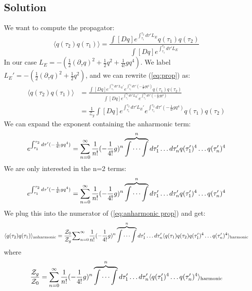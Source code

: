 \documentclass{article}
\begin{document}
\subsection*{Solution}
We want to compute the propagator:\\
\begin{equation} \label{eq:prop}
    \langle q(\tau_2)q(\tau_1)\rangle=\frac{\int [Dq]e^{\int_{\tau_1}^{\tau_2}d\tau'L_E}q(\tau_1)q(\tau_2)}{\int [Dq]e^{\int_{\tau_1}^{\tau_2}d\tau'L_E}}
\end{equation}
In our case $L_E=-(\frac{1}{2}(\partial_\tau q)^2+\frac{1}{2}q^2+\frac{1}{4!}gq^4)$. We label $L_E'=-(\frac{1}{2}(\partial_\tau q)^2+\frac{1}{2}q^2)$, and we can rewrite (\ref{eq:prop}) as:
\begin{equation} 
\begin{split}
    \langle q(\tau_2)q(\tau_1)\rangle & 
    =\frac{\int [Dq]e^{\int_{\tau_1}^{\tau_2}d\tau'L_E'}e^{\int_{\tau_1}^{\tau_2}d\tau' (-\frac{1}{4!}gq^4)}q(\tau_1)q(\tau_2)}{\int [Dq]e^{\int_{\tau_1}^{\tau_2}d\tau'L_E'}e^{\int_{\tau_1}^{\tau_2}d\tau' (-\frac{1}{4!}gq^4)}}\\
    &=\frac{1}{\mathcal{Z}_g}\int [Dq]e^{\int_{\tau_1}^{\tau_2}d\tau'L_E'}e^{\int_{\tau_1}^{\tau_2}d\tau' (-\frac{1}{4!}gq^4)}q(\tau_1)q(\tau_2)
\end{split}
\end{equation}
We can expand the exponent containing the anharmonic term: 
\begin{equation*}
    e^{\int_{\tau_1}^{\tau_2}d\tau' (-\frac{1}{4!}gq^4)}=
    \sum_{n=0}^{\infty}\frac{1}{n!}(-\frac{1}{4!}g)^n\overbrace{\idotsint}^n d\tau_1'\dots d\tau_n' q(\tau_1')^4\dots q(\tau_n')^4
\end{equation*}
We are only interested in the n=2 terms:
\begin{equation*}
    e^{\int_{\tau_1}^{\tau_2}d\tau' (-\frac{1}{4!}gq^4)}=
    \sum_{n=0}^{\infty}\frac{1}{n!}(-\frac{1}{4!}g)^n\overbrace{\idotsint}^n d\tau_1'\dots d\tau_n' q(\tau_1')^4\dots q(\tau_n')^4
\end{equation*}
We plug this into the numerator of (\ref{eq:anharmonic prop}) and get:
\begin{equation*}
   \langle q(\tau_2)q(\tau_1) \rangle_{\text{anharmonic}} = \frac{\mathcal{Z}_0}{\mathcal{Z}_g}\mathcal  \sum_{n=0}^{\infty}\frac{1}{n!}(-\frac{1}{4!}g)^n\overbrace{\idotsint}^n d\tau_1'\dots d\tau_n' \langle q(\tau_1)q(\tau_2) q(\tau_1')^4\dots q(\tau_n')^4\rangle_{\text{harmonic}} 
\end{equation*}
where
\begin{equation*}
   \frac{\mathcal{Z}_g}{\mathcal{Z}_0} = \sum_{n=0}^{\infty}\frac{1}{n!}(-\frac{1}{4!}g)^n\overbrace{\idotsint}^n d\tau_1'\dots d\tau_n' \langle  q(\tau_1')^4\dots q(\tau_n')^4\rangle_{\text{harmonic}} 
\end{equation*}
\end{document}
